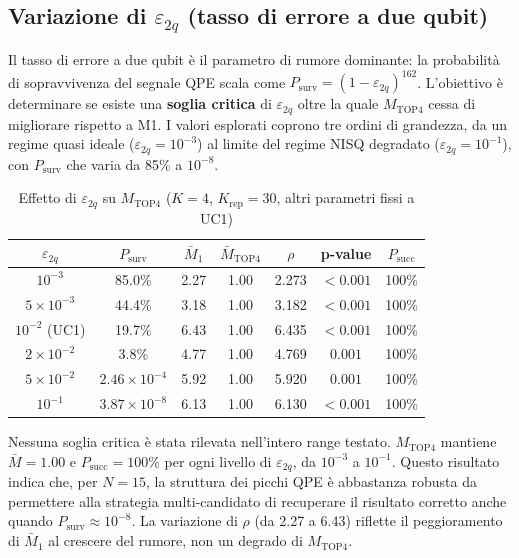 \begin{onehalfspace}
\subsection{Variazione di $\varepsilon_{2q}$ (tasso di errore a due qubit)}
\label{subsec:sweep_eps}

Il tasso di errore a due qubit è il parametro di rumore dominante: la probabilità di sopravvivenza del segnale QPE scala come $P_{\text{surv}} = (1-\varepsilon_{2q})^{162}$. L'obiettivo è determinare se esiste una \textbf{soglia critica} di $\varepsilon_{2q}$ oltre la quale $M_{\text{TOP4}}$ cessa di migliorare rispetto a M1. I valori esplorati coprono tre ordini di grandezza, da un regime quasi ideale ($\varepsilon_{2q}=10^{-3}$) al limite del regime NISQ degradato ($\varepsilon_{2q}=10^{-1}$), con $P_{\text{surv}}$ che varia da 85\% a $10^{-8}$.

\begin{table}[H]
\centering
\caption{Effetto di $\varepsilon_{2q}$ su $M_{\text{TOP4}}$ ($K=4$, $K_{\text{rep}}=30$, altri parametri fissi a UC1)}
\label{tab:sweep_eps}
\begin{tabular}{ccccccc}
\hline
$\varepsilon_{2q}$ & $P_{\text{surv}}$ & $\bar{M}_1$ & $\bar{M}_{\text{TOP4}}$ & $\rho$ & p-value & $P_{\text{succ}}$ \\
\hline
$10^{-3}$          & 85.0\%              & 2.27 & 1.00 & 2.273 & ${<}0.001$ & 100\% \\
$5\times10^{-3}$   & 44.4\%              & 3.18 & 1.00 & 3.182 & ${<}0.001$ & 100\% \\
$10^{-2}$ (UC1)    & 19.7\%              & 6.43 & 1.00 & 6.435 & ${<}0.001$ & 100\% \\
$2\times10^{-2}$   & 3.8\%               & 4.77 & 1.00 & 4.769 & $0.001$    & 100\% \\
$5\times10^{-2}$   & $2.46\times10^{-4}$ & 5.92 & 1.00 & 5.920 & $0.001$    & 100\% \\
$10^{-1}$          & $3.87\times10^{-8}$ & 6.13 & 1.00 & 6.130 & ${<}0.001$ & 100\% \\
\hline
\end{tabular}
\end{table}

Nessuna soglia critica è stata rilevata nell'intero range testato. $M_{\text{TOP4}}$ mantiene $\bar{M}=1.00$ e $P_{\text{succ}}=100\%$ per ogni livello di $\varepsilon_{2q}$, da $10^{-3}$ a $10^{-1}$. Questo risultato indica che, per $N=15$, la struttura dei picchi QPE è abbastanza robusta da permettere alla strategia multi-candidato di recuperare il risultato corretto anche quando $P_{\text{surv}} \approx 10^{-8}$. La variazione di $\rho$ (da 2.27 a 6.43) riflette il peggioramento di $\bar{M}_1$ al crescere del rumore, non un degrado di $M_{\text{TOP4}}$.


\end{onehalfspace}
